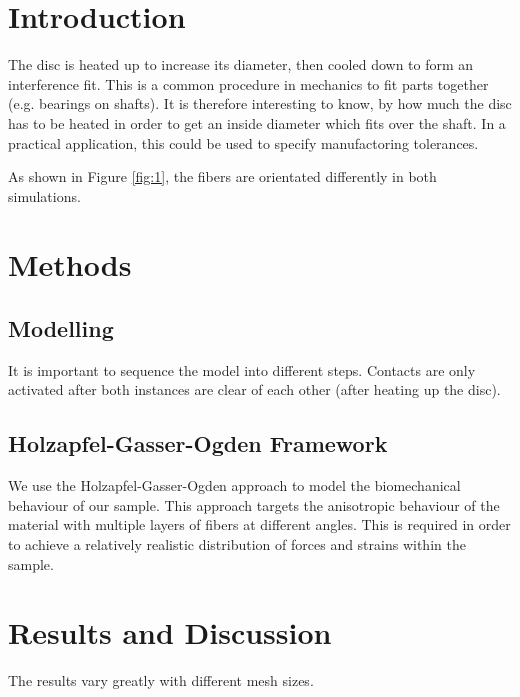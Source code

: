 \documentclass[12pt]{article}
\begin{document}
\tableofcontents
\pagebreak
\section{Introduction}

The disc is heated up to increase its diameter, then cooled down to form an interference fit.
This is a common procedure in mechanics to fit parts together (e.g. bearings on shafts).
It is therefore interesting to know, by how much the disc has to be heated in order to
get an inside diameter which fits over the shaft. In a practical application, this could be used
to specify manufactoring tolerances.



\noindent As shown in Figure \ref{fig:1}, the fibers are orientated differently in both simulations.

\newpage
\section{Methods}

\subsection{Modelling}

It is important to sequence the model into different steps. Contacts are only activated after both
instances are clear of each other (after heating up the disc). 

\subsection{Holzapfel-Gasser-Ogden Framework}

We use the Holzapfel-Gasser-Ogden approach to model the biomechanical behaviour of our
sample. This approach targets the anisotropic behaviour of the material with multiple
layers of fibers at different angles. This is required in order to achieve a relatively
realistic distribution of forces and strains within the sample.\cite{holzapfel}




\pagebreak
\section{Results and Discussion}

The results vary greatly with different mesh sizes. 
\end{document}
